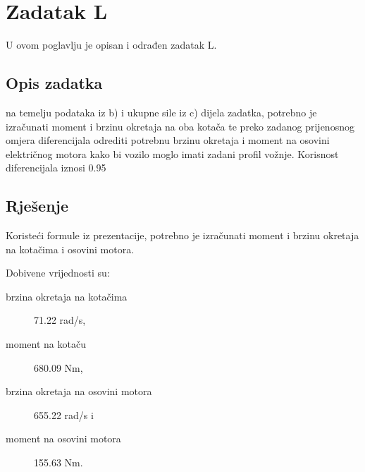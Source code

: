 \chapter{Zadatak L} \label{ch:l}

U ovom poglavlju je opisan i odrađen zadatak L.

\section{Opis zadatka} \label{sec:l:opis}
na temelju podataka iz b) i ukupne sile iz c) dijela zadatka, potrebno je izračunati moment i brzinu
okretaja na oba kotača te preko zadanog prijenosnog omjera diferencijala odrediti potrebnu brzinu
okretaja i moment na osovini električnog motora kako bi vozilo moglo imati zadani profil vožnje.
Korisnost diferencijala iznosi 0.95

\section{Rješenje} \label{sec:l:rjesenje}

Koristeći formule iz prezentacije, potrebno je izračunati moment i brzinu okretaja na kotačima i osovini motora.

Dobivene vrijednosti su:
\begin{description}
    \item[brzina okretaja na kotačima] 71.22 rad/s,
    \item[moment na kotaču] 680.09 Nm,
    \item[brzina okretaja na osovini motora] 655.22 rad/s i
    \item[moment na osovini motora] 155.63 Nm.
\end{description}